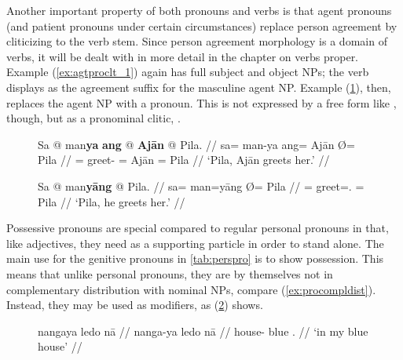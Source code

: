 Another important property of both pronouns and verbs is that agent pronouns
(and patient pronouns under certain circumstances) replace person agreement by
cliticizing to the verb stem. Since person agreement morphology is a domain of
verbs, it will be dealt with in more detail in the chapter on verbs proper. 
Example (\ref{ex:agtproclt_1}) again has full subject and object NPs; the verb
displays  as the agreement suffix for the masculine agent NP.
Example (\ref{ex:agtproclt_2}), then, replaces the agent NP with a pronoun.
This is not expressed by a free form like , though, but as a pronominal
clitic, .

\begin{figure}[h]
\pex\label{ex:agtproclt}
\a\label{ex:agtproclt_1}%
\begingl
	\gla Sa @ man\textbf{ya} \textbf{ang} @ \textbf{Ajān} {} @ Pila. //
	\glb sa= man-ya ang= ​Ajān Ø= ​Pila //
	\glc \PatT{}= greet-\TsgM{} \Aarg{}= ​Ajān \Top{}= ​Pila //
	\glft `Pila, Ajān greets her.' //
\endgl

\a\label{ex:agtproclt_2}%
\begingl
	\gla Sa @ man\textbf{yāng} {} @ Pila. //
	\glb sa= man=yāng Ø= ​Pila //
	\glc \PatT{}= greet=\TsgM{}.\Aarg{} \Top{}= Pila //
	\glft `Pila, he greets her.' //
\endgl
\xe
\end{figure}


\label{phsec:possadj}
Possessive pronouns are special compared to regular personal pronouns in that,
like adjectives, they need  as a supporting particle in order to
stand alone. The main use for the genitive pronouns in \autoref{tab:perspro} is
to show possession. This means that unlike personal pronouns, they are by
themselves not in complementary distribution with nominal NPs, compare
(\ref{ex:procompldist}). Instead, they may be used as modifiers, as
(\ref{ex:adjgen}) shows.

\begin{figure}[h]
\ex\label{ex:adjgen}%
\begingl
	\gla nangaya ledo nā //
	\glb nanga-ya ledo nā //
	\glc house-\Loc{} blue \Fsg{}.\Gen{} //
	\glft `in my blue house' //
\endgl
\xe
\end{figure}

